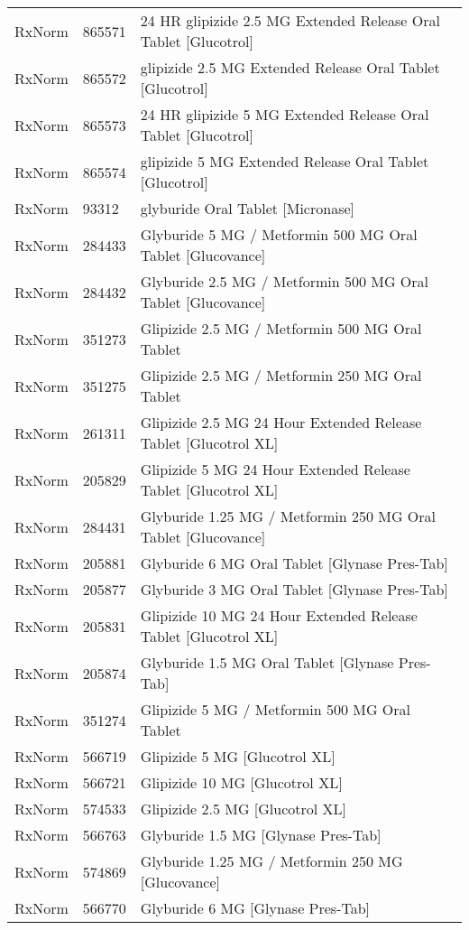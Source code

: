 \begin{longtable}{p{}p{}p{}}
  RxNorm & 865571 & 24 HR glipizide 2.5 MG Extended Release Oral Tablet [Glucotrol] \\ 
  RxNorm & 865572 & glipizide 2.5 MG Extended Release Oral Tablet [Glucotrol] \\ 
  RxNorm & 865573 & 24 HR glipizide 5 MG Extended Release Oral Tablet [Glucotrol] \\ 
  RxNorm & 865574 & glipizide 5 MG Extended Release Oral Tablet [Glucotrol] \\ 
  RxNorm & 93312 & glyburide Oral Tablet [Micronase] \\ 
  RxNorm & 284433 & Glyburide 5 MG / Metformin 500 MG Oral Tablet [Glucovance] \\ 
  RxNorm & 284432 & Glyburide 2.5 MG / Metformin 500 MG Oral Tablet [Glucovance] \\ 
  RxNorm & 351273 & Glipizide 2.5 MG / Metformin 500 MG Oral Tablet \\ 
  RxNorm & 351275 & Glipizide 2.5 MG / Metformin 250 MG Oral Tablet \\ 
  RxNorm & 261311 & Glipizide 2.5 MG 24 Hour Extended Release Tablet [Glucotrol XL] \\ 
  RxNorm & 205829 & Glipizide 5 MG 24 Hour Extended Release Tablet [Glucotrol XL] \\ 
  RxNorm & 284431 & Glyburide 1.25 MG / Metformin 250 MG Oral Tablet [Glucovance] \\ 
  RxNorm & 205881 & Glyburide 6 MG Oral Tablet [Glynase Pres-Tab] \\ 
  RxNorm & 205877 & Glyburide 3 MG Oral Tablet [Glynase Pres-Tab] \\ 
  RxNorm & 205831 & Glipizide 10 MG 24 Hour Extended Release Tablet [Glucotrol XL] \\ 
  RxNorm & 205874 & Glyburide 1.5 MG Oral Tablet [Glynase Pres-Tab] \\ 
  RxNorm & 351274 & Glipizide 5 MG / Metformin 500 MG Oral Tablet \\ 
  RxNorm & 566719 & Glipizide 5 MG [Glucotrol XL] \\ 
  RxNorm & 566721 & Glipizide 10 MG [Glucotrol XL] \\ 
  RxNorm & 574533 & Glipizide 2.5 MG [Glucotrol XL] \\ 
  RxNorm & 566763 & Glyburide 1.5 MG [Glynase Pres-Tab] \\ 
  RxNorm & 574869 & Glyburide 1.25 MG / Metformin 250 MG [Glucovance] \\ 
  RxNorm & 566770 & Glyburide 6 MG [Glynase Pres-Tab] \\ 

\end{longtable}

